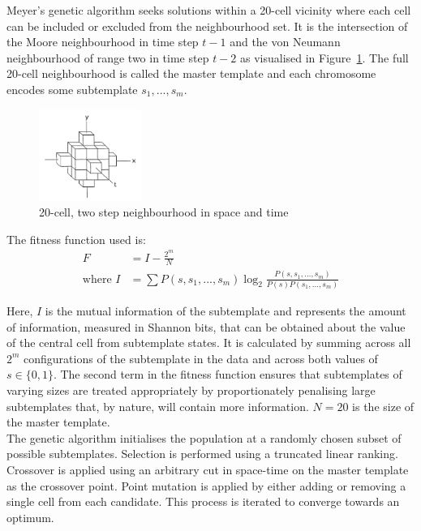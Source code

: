 Meyer's genetic algorithm seeks solutions within a 20-cell vicinity where each cell can be included or excluded from the neighbourhood set. It is the intersection of the Moore neighbourhood in time step $t-1$ and the von Neumann neighbourhood of range two in time step $t-2$ as visualised in Figure~\ref{fig:20-near}. The full 20-cell neighbourhood is called the master template and each chromosome encodes some subtemplate ${s_1, ..., s_m}$.\\

\begin{figure}[!h]
\centering
\includegraphics[width=0.3\textwidth]{images/20_neighbourhood.png}
\caption{20-cell, two step neighbourhood in space and time\cite{meyer1989learning}}
\label{fig:20-near}
\end{figure}

The fitness function used is:
\begin{align*}
                    F &= I - \frac{2^m}{N}\\
    \text{where\ }  I &= \sum P(s, s_1, ..., s_m)\log_2{\frac{P(s, s_1, ..., s_m)}{P(s)P(s_1, ..., s_m)}}
\end{align*}

Here, $I$ is the mutual information of the subtemplate and represents the amount of information, measured in Shannon bits, that can be obtained about the value of the central cell from subtemplate states. It is calculated by summing across all $2^m$ configurations of the subtemplate in the data and across both values of $s \in \{0,1\}$. The second term in the fitness function ensures that subtemplates of varying sizes are treated appropriately by proportionately penalising large subtemplates that, by nature, will contain more information. $N=20$ is the size of the master template.\\

The genetic algorithm initialises the population at a randomly chosen subset of possible subtemplates. Selection is performed using a truncated linear ranking. Crossover is applied using an arbitrary cut in space-time on the master template as the crossover point. Point mutation is applied by either adding or removing a single cell from each candidate. This process is iterated to converge towards an optimum.\\

